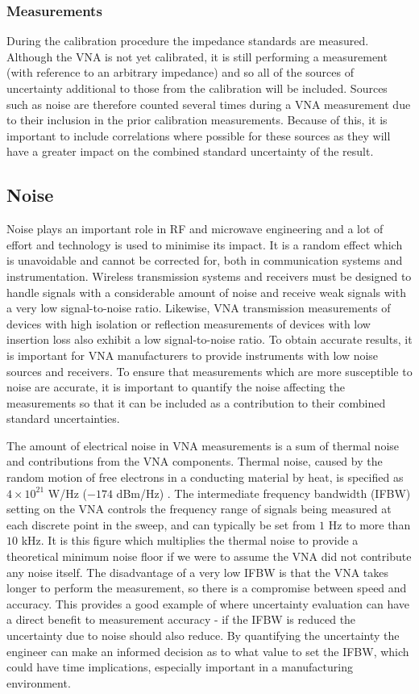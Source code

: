 \documentclass[../thesis/thesis.tex]{subfiles}
\begin{document}
\subsubsection{Measurements}

During the calibration procedure the impedance standards are measured. Although the VNA is not yet calibrated, it is still performing a measurement (with reference to an arbitrary impedance) and so all of the sources of uncertainty additional to those from the calibration will be included. Sources such as noise are therefore counted several times during a VNA measurement due to their inclusion in the prior calibration measurements. Because of this, it is important to include correlations where possible for these sources as they will have a greater impact on the combined standard uncertainty of the result.

\subsection{Noise}

Noise plays an important role in RF and microwave engineering and a lot of effort and technology is used to minimise its impact. It is a random effect which is unavoidable and cannot be corrected for, both in communication systems and instrumentation. Wireless transmission systems and receivers must be designed to handle signals with a considerable amount of noise and receive weak signals with a very low signal-to-noise ratio. Likewise, VNA transmission measurements of devices with high isolation or reflection measurements of devices with low insertion loss also exhibit a low signal-to-noise ratio. To obtain accurate results, it is important for VNA manufacturers to provide instruments with low noise sources and receivers. To ensure that measurements which are more susceptible to noise are accurate, it is important to quantify the noise affecting the measurements so that it can be included as a contribution to their combined standard uncertainties.

The amount of electrical noise in VNA measurements is a sum of thermal noise and contributions from the VNA components. Thermal noise, caused by the random motion of free electrons in a conducting material by heat, is specified as $4\times 10^{21}$ W/Hz ($-174$ dBm/Hz) \cite{Hiebel_2008}. The intermediate frequency bandwidth (IFBW) setting on the VNA controls the frequency range of signals being measured at each discrete point in the sweep, and can typically be set from $1$ Hz to more than $10$ kHz. It is this figure which multiplies the thermal noise to provide a theoretical minimum noise floor if we were to assume the VNA did not contribute any noise itself. The disadvantage of a very low IFBW is that the VNA takes longer to perform the measurement, so there is a compromise between speed and accuracy. This provides a good example of where uncertainty evaluation can have a direct benefit to measurement accuracy - if the IFBW is reduced the uncertainty due to noise should also reduce. By quantifying the uncertainty the engineer can make an informed decision as to what value to set the IFBW, which could have time implications, especially important in a manufacturing environment.
\end{document}
